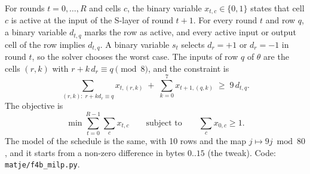 \documentclass[11pt,a4paper]{article}
\begin{document}
For rounds $t = 0,\dots,R$ and cells $c$, the binary variable $x_{t,c} \in \{0,1\}$ states that cell $c$ is active
at the input of the S-layer of round $t+1$. For every round $t$ and row $q$, a binary variable $d_{t,q}$ marks the
row as active, and every active input or output cell of the row implies $d_{t,q}$. A binary variable $s_t$ selects
$d_r = +1$ or $d_r = -1$ in round $t$, so the solver chooses the worst case. The inputs of row $q$ of $\theta$ are
the cells $(r,k)$ with $r + k\,d_r \equiv q \pmod 8$, and the constraint is
\[
  \sum_{(r,k):\; r + k d_r \equiv q} x_{t,(r,k)} \;+\; \sum_{k=0}^{7} x_{t+1,(q,k)} \;\ge\; 9\, d_{t,q} .
\]
The objective is
\[
  \min \sum_{t=0}^{R-1} \sum_{c} x_{t,c} \qquad \text{subject to} \qquad \sum_c x_{0,c} \ge 1 .
\]
The model of the schedule is the same, with 10 rows and the map $j \mapsto 9j \bmod 80$, and it starts from a
non-zero difference in bytes $0..15$ (the tweak). Code: \texttt{matje/f4b\_milp.py}.
\end{document}
